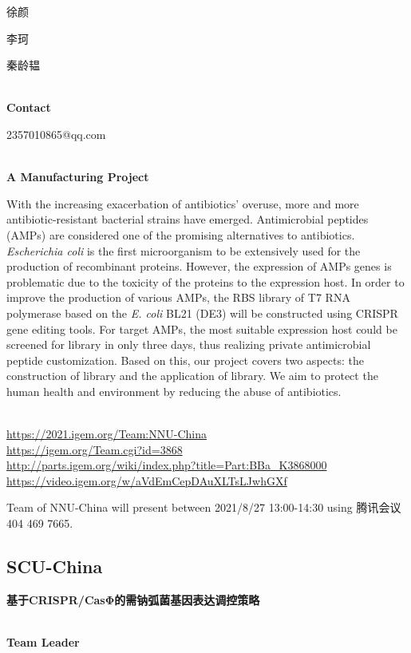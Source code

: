  徐颜

  李珂

  秦龄韫


\textbf{\\Contact}

  2357010865@qq.com


\textbf{\\A Manufacturing Project\\}\begin{spacing}{1.5}

With the increasing exacerbation of antibiotics' overuse, more and more antibiotic-resistant bacterial strains have emerged. Antimicrobial peptides (AMPs) are considered one of the promising alternatives to antibiotics. \textit{Escherichia coli} is the first microorganism to be extensively used for the production of recombinant proteins. However, the expression of AMPs genes is problematic due to the toxicity of the proteins to the expression host. In order to improve the production of various AMPs, the RBS library of T7 RNA polymerase based on the \textit{E. coli} BL21 (DE3) will be constructed using CRISPR gene editing tools. For target AMPs, the most suitable expression host could be screened for library in only three days, thus realizing private antimicrobial peptide customization. Based on this, our project covers two aspects: the construction of library and the application of library. We aim to protect the human health and environment by reducing the abuse of antibiotics.\end{spacing}
\\

\url{https://2021.igem.org/Team:NNU-China }\\
\url{https://igem.org/Team.cgi?id=3868 }\\
\url{http://parts.igem.org/wiki/index.php?title=Part:BBa_K3868000 }\\
\url{https://video.igem.org/w/aVdEmCepDAuXLTsLJwhGXf }\\

\vfill{}









Team of NNU-China will present between 2021/8/27 13:00-14:30        using 腾讯会议 404 469 7665.
\newpage


\subsection{\textcolor{Blu}{ SCU-China } }
\vspace{5mm}
\begin{center}
\large{
  \textbf{ 基于CRISPR/CasΦ的需钠弧菌基因表达调控策略 }\\

}
\end{center}
\textbf{\\Team Leader}

